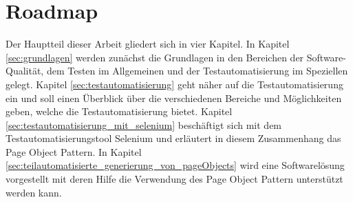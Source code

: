 \section{Roadmap}
\label{roadmap}
Der Hauptteil dieser Arbeit gliedert sich in vier Kapitel. In Kapitel \ref{sec:grundlagen} werden zunächst die Grundlagen in den Bereichen der Software-Qualität, dem Testen im Allgemeinen und der Testautomatisierung im Speziellen gelegt.
Kapitel \ref{sec:testautomatisierung} geht näher auf die Testautomatisierung ein und soll einen Überblick über die verschiedenen Bereiche und Möglichkeiten geben, welche die Testautomatisierung bietet.
Kapitel \ref{sec:testautomatisierung_mit_selenium} beschäftigt sich mit dem Testautomatisierungstool Selenium und erläutert in diesem Zusammenhang das Page Object Pattern.
In Kapitel \ref{sec:teilautomatisierte_generierung_von_pageObjects} wird eine Softwarelösung vorgestellt mit deren Hilfe die Verwendung des Page Object Pattern unterstützt werden kann.

  




